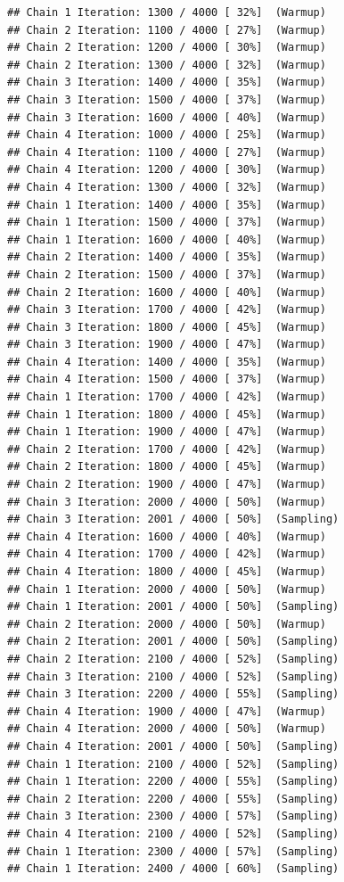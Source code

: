 \documentclass[
]{article}
\begin{document}
\begin{verbatim}
## Chain 1 Iteration: 1300 / 4000 [ 32%]  (Warmup) 
## Chain 2 Iteration: 1100 / 4000 [ 27%]  (Warmup) 
## Chain 2 Iteration: 1200 / 4000 [ 30%]  (Warmup) 
## Chain 2 Iteration: 1300 / 4000 [ 32%]  (Warmup) 
## Chain 3 Iteration: 1400 / 4000 [ 35%]  (Warmup) 
## Chain 3 Iteration: 1500 / 4000 [ 37%]  (Warmup) 
## Chain 3 Iteration: 1600 / 4000 [ 40%]  (Warmup) 
## Chain 4 Iteration: 1000 / 4000 [ 25%]  (Warmup) 
## Chain 4 Iteration: 1100 / 4000 [ 27%]  (Warmup) 
## Chain 4 Iteration: 1200 / 4000 [ 30%]  (Warmup) 
## Chain 4 Iteration: 1300 / 4000 [ 32%]  (Warmup) 
## Chain 1 Iteration: 1400 / 4000 [ 35%]  (Warmup) 
## Chain 1 Iteration: 1500 / 4000 [ 37%]  (Warmup) 
## Chain 1 Iteration: 1600 / 4000 [ 40%]  (Warmup) 
## Chain 2 Iteration: 1400 / 4000 [ 35%]  (Warmup) 
## Chain 2 Iteration: 1500 / 4000 [ 37%]  (Warmup) 
## Chain 2 Iteration: 1600 / 4000 [ 40%]  (Warmup) 
## Chain 3 Iteration: 1700 / 4000 [ 42%]  (Warmup) 
## Chain 3 Iteration: 1800 / 4000 [ 45%]  (Warmup) 
## Chain 3 Iteration: 1900 / 4000 [ 47%]  (Warmup) 
## Chain 4 Iteration: 1400 / 4000 [ 35%]  (Warmup) 
## Chain 4 Iteration: 1500 / 4000 [ 37%]  (Warmup) 
## Chain 1 Iteration: 1700 / 4000 [ 42%]  (Warmup) 
## Chain 1 Iteration: 1800 / 4000 [ 45%]  (Warmup) 
## Chain 1 Iteration: 1900 / 4000 [ 47%]  (Warmup) 
## Chain 2 Iteration: 1700 / 4000 [ 42%]  (Warmup) 
## Chain 2 Iteration: 1800 / 4000 [ 45%]  (Warmup) 
## Chain 2 Iteration: 1900 / 4000 [ 47%]  (Warmup) 
## Chain 3 Iteration: 2000 / 4000 [ 50%]  (Warmup) 
## Chain 3 Iteration: 2001 / 4000 [ 50%]  (Sampling) 
## Chain 4 Iteration: 1600 / 4000 [ 40%]  (Warmup) 
## Chain 4 Iteration: 1700 / 4000 [ 42%]  (Warmup) 
## Chain 4 Iteration: 1800 / 4000 [ 45%]  (Warmup) 
## Chain 1 Iteration: 2000 / 4000 [ 50%]  (Warmup) 
## Chain 1 Iteration: 2001 / 4000 [ 50%]  (Sampling) 
## Chain 2 Iteration: 2000 / 4000 [ 50%]  (Warmup) 
## Chain 2 Iteration: 2001 / 4000 [ 50%]  (Sampling) 
## Chain 2 Iteration: 2100 / 4000 [ 52%]  (Sampling) 
## Chain 3 Iteration: 2100 / 4000 [ 52%]  (Sampling) 
## Chain 3 Iteration: 2200 / 4000 [ 55%]  (Sampling) 
## Chain 4 Iteration: 1900 / 4000 [ 47%]  (Warmup) 
## Chain 4 Iteration: 2000 / 4000 [ 50%]  (Warmup) 
## Chain 4 Iteration: 2001 / 4000 [ 50%]  (Sampling) 
## Chain 1 Iteration: 2100 / 4000 [ 52%]  (Sampling) 
## Chain 1 Iteration: 2200 / 4000 [ 55%]  (Sampling) 
## Chain 2 Iteration: 2200 / 4000 [ 55%]  (Sampling) 
## Chain 3 Iteration: 2300 / 4000 [ 57%]  (Sampling) 
## Chain 4 Iteration: 2100 / 4000 [ 52%]  (Sampling) 
## Chain 1 Iteration: 2300 / 4000 [ 57%]  (Sampling) 
## Chain 1 Iteration: 2400 / 4000 [ 60%]  (Sampling) 

\end{verbatim}
\end{document}
